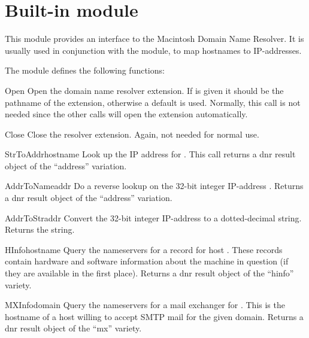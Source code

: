 
\section{Built-in module }

This module provides an interface to the Macintosh Domain Name
Resolver. It is usually used in conjunction with the  module, to
map hostnames to IP-addresses.

The  module defines the following functions:

\renewcommand{\indexsubitem}{(in module macdnr)}

\begin{funcdesc}{Open}{}
Open the domain name resolver extension. If  is given it
should be the pathname of the extension, otherwise a default is
used. Normally, this call is not needed since the other calls will
open the extension automatically.
\end{funcdesc}

\begin{funcdesc}{Close}{}
Close the resolver extension. Again, not needed for normal use.
\end{funcdesc}

\begin{funcdesc}{StrToAddr}{hostname}
Look up the IP address for . This call returns a dnr
result object of the ``address'' variation.
\end{funcdesc}

\begin{funcdesc}{AddrToName}{addr}
Do a reverse lookup on the 32-bit integer IP-address
. Returns a dnr result object of the ``address'' variation.
\end{funcdesc}

\begin{funcdesc}{AddrToStr}{addr}
Convert the 32-bit integer IP-address  to a dotted-decimal
string. Returns the string.
\end{funcdesc}

\begin{funcdesc}{HInfo}{hostname}
Query the nameservers for a  record for host
. These records contain hardware and software
information about the machine in question (if they are available in
the first place). Returns a dnr result object of the ``hinfo''
variety.
\end{funcdesc}

\begin{funcdesc}{MXInfo}{domain}
Query the nameservers for a mail exchanger for . This is
the hostname of a host willing to accept SMTP mail for the given
domain. Returns a dnr result object of the ``mx'' variety.
\end{funcdesc}

